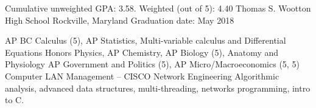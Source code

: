

\begin{cventries}

  \cventry %
    {Cumulative unweighted GPA: 3.58. Weighted (out of 5): 4.40} %
    {Thomas S. Wootton High School} %
    {Rockville, Maryland} %
    {Graduation date: May 2018} %
    {
    \begin{cvsklist}
    	{ AP BC Calculus (5), AP Statistics, Multi-variable calculus and Differential Equations}
        {Honors Physics, AP Chemistry, AP Biology (5), Anatomy and Physiology}
        {AP Government and Politics (5), AP Micro/Macroeconomics (5, 5)}
        {Computer LAN Management – CISCO Network Engineering}
        {Algorithmic analysis, advanced data structures, multi-threading, networks programming, intro to C.}
    \end{cvsklist}
    }

\end{cventries}
